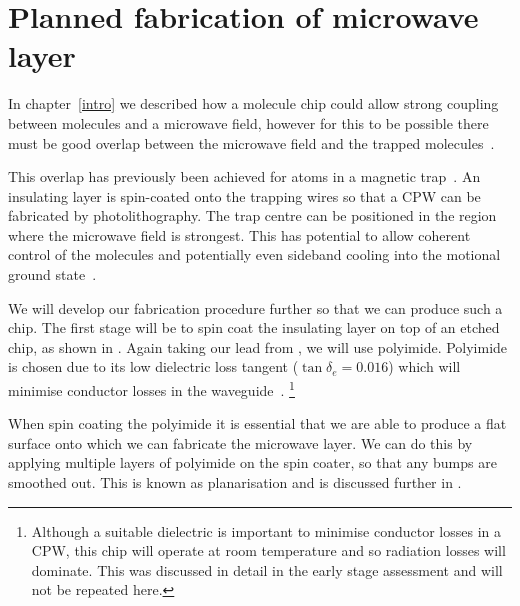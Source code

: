 \section{Planned fabrication of microwave layer}
\label{fab:planned}

In chapter~\ref{intro} 
we described how a molecule chip could allow strong coupling between \CaF{}
molecules and a microwave field, however for this to be possible there must be
good overlap between the microwave field and the trapped
molecules~\cite{Andre2006}.
%

This overlap has previously been achieved for atoms in a magnetic
trap~\cite{Treutlein2008}. An insulating layer is spin-coated onto the trapping
wires so that a CPW  can be fabricated by
photolithography. The trap centre can be positioned in the region where the
microwave field is strongest. This has potential to allow coherent control of
the molecules and potentially even sideband cooling into the motional ground
state~\cite{Andre2006}.
%

We will develop our fabrication procedure further so that we can produce such a
chip. The first stage will be to spin coat the insulating layer on top of an
etched chip, as shown in . Again taking our lead
from , we will use polyimide. Polyimide is chosen due
to its low dielectric loss tangent ($\tan\delta_e = 0.016$) which will minimise
conductor losses in the waveguide~\cite{Collin2007, Simons2004}.
\footnote{Although a suitable dielectric is
important to minimise conductor losses in a CPW, this chip will operate at room
temperature and so radiation losses will dominate. This was discussed in detail
in the early stage assessment and will not be repeated here.}
%

When spin coating the polyimide it is essential that we are able to produce a
flat surface onto which we can fabricate the microwave layer. We can do this by
applying multiple layers of polyimide on the spin coater, so that any bumps are
smoothed out. This is known as planarisation and is discussed further in
.

